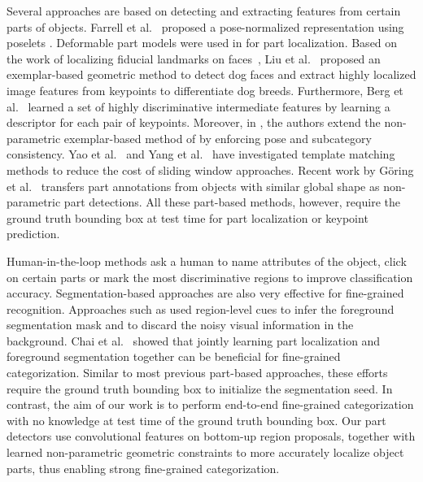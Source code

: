 Several approaches are based on detecting and extracting features from certain parts of objects. Farrell et al.~\cite{BirdletsFarrellICCV11} proposed a pose-normalized representation using poselets \cite{BourdevMalikICCV09}. Deformable part models \cite{dpm} were used in \cite{ParkhiEtalCVPR12,dpd} for part localization. Based on the work of localizing fiducial landmarks on faces~\cite{Belhumeur_Localizing_2011}, Liu et al.~\cite{Liu_Dogs_2012} proposed an exemplar-based geometric method to detect dog faces and extract highly localized image features from keypoints to differentiate dog breeds. Furthermore, Berg et al.~\cite{poof} learned a set of highly discriminative intermediate features by learning a descriptor for each pair of keypoints. Moreover, in \cite{iccv13_keypoint}, the authors extend the non-parametric exemplar-based method of \cite{Belhumeur_Localizing_2011} by enforcing pose and subcategory consistency. Yao et al.~\cite{YaoEtalCVPR12} and Yang et al.~\cite{UW_NIPS12} have investigated template matching methods to reduce the cost of sliding window approaches. Recent work by G\"{o}ring et al.~\cite{Goering14:NPT} transfers part annotations from objects with similar global shape as non-parametric part detections. 
All these part-based methods, however, require the ground truth bounding box at test time for part localization or keypoint prediction. 

Human-in-the-loop methods \cite{BransonEtalECCV10,Deng_FineCrowd_2013,DuanEtalCVPR12} ask a human to name attributes of the object, click on certain parts or mark the most discriminative regions to improve classification accuracy.
Segmentation-based approaches are also very effective for fine-grained recognition.
Approaches such as \cite{Tricos_Chai_ECCV12,iccv13_alignment,ParkhiEtalICCV11,ParkhiEtalCVPR12,iccv13_partmatching} used region-level cues to infer the foreground segmentation mask and to discard the noisy visual information in the background.
Chai et al.~\cite{iccv13_symbiotic} showed that jointly learning part localization and foreground segmentation together can be beneficial for fine-grained categorization.
Similar to most previous part-based approaches, these efforts require the ground truth bounding box to initialize the segmentation seed.
In contrast, the aim of our work is to perform end-to-end fine-grained categorization with no knowledge at test time of the ground truth bounding box.
Our part detectors use convolutional features on bottom-up region proposals, together with learned non-parametric geometric constraints to more accurately localize object parts, thus enabling strong fine-grained categorization.


